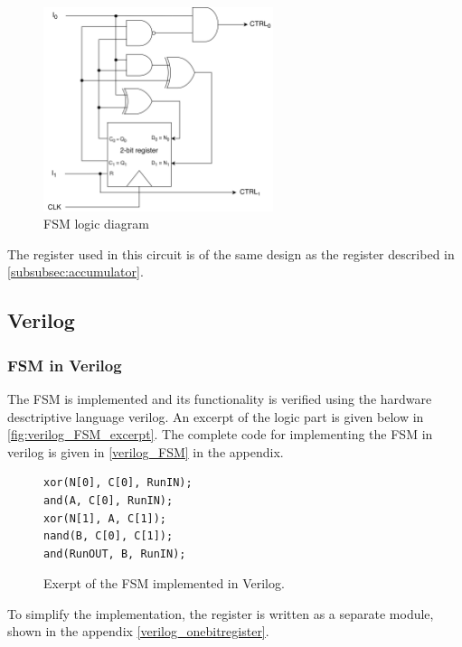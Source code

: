 \begin{figure}[H]
    \centering
    \includegraphics[width=0.6\textwidth]{Figures/logic diagram.png}
    \caption{FSM logic diagram}
    \label{fig:fsm_logic_diagram}
\end{figure}

\noindent
The register used in this circuit is of the same design as the register described in \autoref{subsubsec:accumulator}.


\subsection{Verilog}

\subsubsection{FSM in Verilog}
\label{subsec:fsm_verilog}

The FSM is implemented and its functionality is verified using the hardware desctriptive language verilog. An excerpt of the logic part is given below in \autoref{fig:verilog_FSM_excerpt}. The complete code for implementing the FSM in verilog is given in \autoref{verilog_FSM} in the appendix.


\begin{figure}[H]
\centering
\caption{Exerpt of the FSM implemented in Verilog.}
\label{fig:verilog_FSM_excerpt}
\begin{minipage}{0.33\textwidth}
\begin{lstlisting}[style=verilogStyle]
xor(N[0], C[0], RunIN);
and(A, C[0], RunIN);
xor(N[1], A, C[1]);
nand(B, C[0], C[1]);
and(RunOUT, B, RunIN);
\end{lstlisting}
\end{minipage}
\end{figure}


To simplify the implementation, the register is written as a separate module, shown in the appendix \autoref{verilog_onebitregister}.

